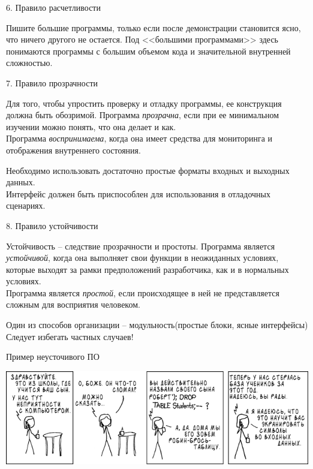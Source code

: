\begin{frame}{6. Правило расчетливости}
	\begin{block}{Пишите большие программы,  только если после демонстрации становится ясно,  что ничего другого не остается.}
		Под <<большими программами>> здесь понимаются программы с большим объемом кода и значительной внутренней сложностью.
	\end{block}
\end{frame}

\begin{frame}{7. Правило прозрачности}
	\begin{block}{Для того,  чтобы упростить проверку и отладку программы,  ее конструкция должна быть обозримой.}
		\pause
		Программа {\itshape прозрачна}, если при ее минимальном изучении можно понять, что она делает и как.\\
		\pause
		Программа {\itshape воспринимаема},  когда она имеет средства для мониторинга и отображения внутреннего состояния.
	\end{block}
	\pause
	Необходимо использовать достаточно простые форматы входных и выходных данных.\\
	Интерфейс должен быть приспособлен для использования в отладочных сценариях.
\end{frame}

\begin{frame}{8. Правило устойчивости}
	\begin{block}{Устойчивость -- следствие	прозрачности и простоты.}
		\pause
		Программа является {\itshape устойчивой},  когда она выполняет свои функции в неожиданных условиях,  которые выходят за рамки предположений разработчика,  как и в нормальных условиях.\\
		\pause
		Программа является {\itshape простой},  если происходящее в ней не представляется сложным для восприятия человеком.
	\end{block}
	\pause
	Один из способов организации -- модульность(простые блоки,  ясные интерфейсы)\\
	Следует избегать частных случаев!
\end{frame}

\begin{frame}{Пример неусточивого ПО}
	\begin{center}
		\includegraphics[width=1\textwidth]{exploits_of_a_mom_rus.png}
	\end{center}
\end{frame}


